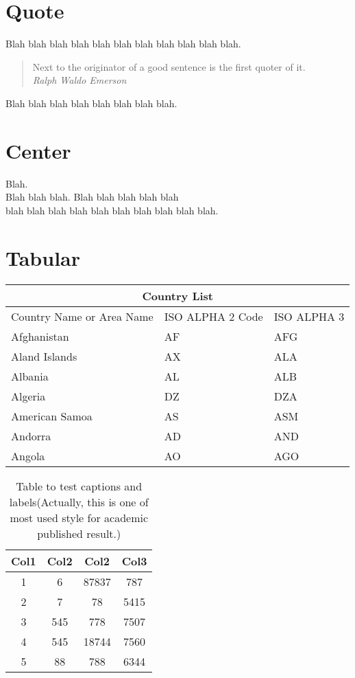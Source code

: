 \documentclass[12pt]{article}
\begin{document}
\section{Quote}
Blah blah blah blah blah blah blah blah blah blah blah.
\begin{quote}
Next to the originator of a good sentence
is the first quoter of it. \\
\emph{Ralph Waldo Emerson}
\end{quote}
Blah blah blah blah blah blah blah blah.

\section{Center}
\begin{center}
Blah.\\
Blah blah blah.
Blah blah blah blah blah\\
blah blah blah blah blah
blah blah blah blah blah.
\end{center}

\section{Tabular}
\begin{tabular}{ |p{3cm}|p{3cm}|p{3cm}|  }
\hline
\multicolumn{3}{|c|}{Country List} \\
\hline
Country Name     or Area Name& ISO ALPHA 2 Code &ISO ALPHA 3 \\
\hline
Afghanistan & AF &AFG \\
Aland Islands & AX   & ALA \\
Albania &AL & ALB \\
Algeria    &DZ & DZA \\
American Samoa & AS & ASM \\
Andorra & AD & AND   \\
Angola & AO & AGO \\
\hline
\end{tabular}

\begin{table}[h!]
\centering
\begin{tabular}{c c c c} 
 \hline
 Col1 & Col2 & Col2 & Col3 \\ 
 \hline
 1 & 6 		& 87837 	& 787 \\ 
 2 & 7 		& 78 		& 5415 \\
 3 & 545 	& 778 		& 7507 \\
 4 & 545 	& 18744 	& 7560 \\
 5 & 88 	& 788 		& 6344 \\ 
 \hline
\end{tabular}
\caption{Table to test captions and labels(Actually, this is one of most used style for academic published result.)}
\label{table:1}
\end{table}
\end{document}
